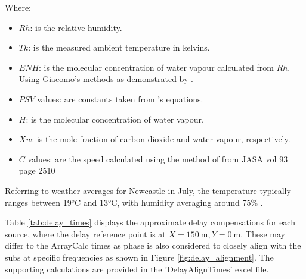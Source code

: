         Where:
        \begin{itemize}
            \item $Rh$: is the relative humidity.
            \item $Tk$: is the measured ambient temperature in kelvins.
            \item $ENH$: is the molecular concentration of water vapour calculated from $Rh$. Using Giacomo's methods as demonstrated by \citeauthor{rasmussen1997}.
            \item $PSV$ values: are constants taken from \citeauthor{cramer1993}'s equations.
            \item $H$: is the molecular concentration of water vapour.
            \item $Xw$: is the mole fraction of carbon dioxide and water vapour, respectively.
            \item $C$ values: are the speed calculated using the method of \citeauthor{cramer1993} from JASA vol 93 page 2510
        \end{itemize}
        
        Referring to weather averages for Newcastle in July, the temperature typically ranges between 19°C and 13°C, with humidity averaging around 75\% \citep{worldweatheronline2023}.

        Table \ref{tab:delay_times} displays the approximate delay compensations for each source, where the delay reference point is at $X=\SI{150}{\metre}, Y=\SI{0}{\metre}$. These may differ to the ArrayCalc times as phase is also considered to closely align with the subs at specific frequencies as shown in Figure \ref{fig:delay_alignment}. The supporting calculations are provided in the 'DelayAlignTimes' excel file.


